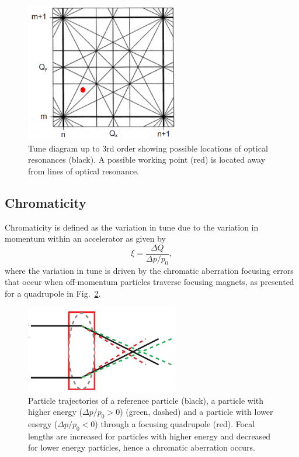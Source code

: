 \documentclass[../main.tex]{subfiles}
\begin{document}
\begin{figure}[!h]
\centering
\includegraphics[width=0.6\textwidth]{Figures/Energy_Recovery_Linac_Design/Tune_Diagram_fixed.pdf}
\caption{Tune diagram up to 3rd order showing possible locations of optical resonances \cite{wille2000physics} (black). A possible working point (red) is located away from lines of optical resonance.}
\label{fig:tune_diagram}
\end{figure}

\subsection{Chromaticity}

Chromaticity is defined as the variation in tune due to the variation in momentum within an accelerator as given by
\begin{equation}
\xi = \frac{\Delta Q}{\Delta p/p_{0}},
\label{eq:accelerator_chromaticity}    
\end{equation}
where the variation in tune is driven by the chromatic aberration focusing errors that occur when off-momentum particles traverse focusing magnets, as presented for a quadrupole in Fig.~\ref{fig:chromatic_aberration}.

\begin{figure}[!h]
\centering
\includegraphics[width=0.6\textwidth]{Figures/Energy_Recovery_Linac_Design/Chromatic_Aberration_fixed.pdf}
\caption{Particle trajectories of a reference particle (black), a particle with higher energy ($\Delta p/p_{0}>0$) (green, dashed) and a particle with lower energy ($\Delta p/p_{0}<0$) through a focusing quadrupole (red). Focal lengths are increased for particles with higher energy and decreased for lower energy particles, hence a chromatic aberration occurs. }
\label{fig:chromatic_aberration}
\end{figure}
\end{document}
